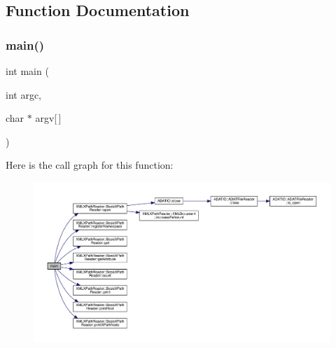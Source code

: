 \subsection{Function Documentation}
\mbox{\label{adat-devel_2other__libs_2xpath__reader_2examples_2basic__xpath__reader__test2_8cc_a0ddf1224851353fc92bfbff6f499fa97}} 
\subsubsection{\texorpdfstring{main()}{main()}}
{\footnotesize\ttfamily int main (\begin{DoxyParamCaption}\item[{int}]{argc,  }\item[{char $\ast$}]{argv\mbox{[}$\,$\mbox{]} }\end{DoxyParamCaption})}

Here is the call graph for this function\+:
\nopagebreak
\begin{figure}[H]
\begin{center}
\leavevmode
\includegraphics[width=350pt]{d5/d3e/adat-devel_2other__libs_2xpath__reader_2examples_2basic__xpath__reader__test2_8cc_a0ddf1224851353fc92bfbff6f499fa97_cgraph}
\end{center}
\end{figure}
